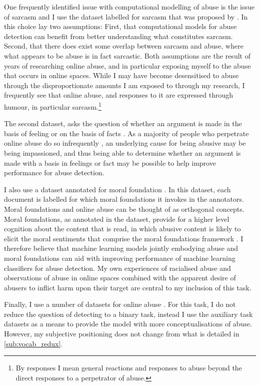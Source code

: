 {One frequently identified issue with computational modelling of abuse is the issue of sarcasm \citep{Rottger:2021} and I use the dataset labelled for sarcasm that was proposed by \citet{Oraby_sarcasm:2016}.
In this choice lay two assumptions: First, that computational models for abuse detection can benefit from better understanding what constitutes sarcasm.
Second, that there does exist some overlap between sarcasm and abuse, where what appears to be abuse is in fact sarcastic.
Both assumptions are the result of years of researching online abuse, and in particular exposing myself to the abuse that occurs in online spaces.
While I may have become desensitised to abuse through the disproportionate amounts I am exposed to through my research, I frequently see that online abuse, and responses to it are expressed through humour, in particular sarcasm.\footnote{By responses I mean general reactions and responses to abuse beyond the direct responses to a perpetrator of abuse.}

The second dataset, asks the question of whether an argument is made in the basis of feeling or on the basis of facts \citep{Oraby_factfeel:2015}.
As a majority of people who perpetrate online abuse do so infrequently \citep{Waseem-Hovy:2016}, an underlying cause for being abusive may be being impassioned, and thus being able to determine whether an argument is made with a basis in feelings or fact may be possible to help improve performance for abuse detection.

I also use a dataset annotated for moral foundation \citep{Hoover:2019}.
In this dataset, each document is labelled for which moral foundations it invokes in the annotators.
Moral foundations and online abuse can be thought of as orthogonal concepts.
Moral foundations, as annotated in the dataset, provide for a higher level cognition about the content that is read, in which abusive content is likely to elicit the moral sentiments that comprise the moral foundations framework \citep{Hoover:2019}.
I therefore believe that machine learning models jointly embodying abuse and moral foundations can aid with improving performance of machine learning classifiers for abuse detection.
My own experiences of racialised abuse and observations of abuse in online spaces combined with the apparent desire of abusers to inflict harm upon their target are central to my inclusion of this task.

Finally, I use a number of datasets for online abuse \citep{Garcia:2018,Waseem:2016,Waseem-Hovy:2016,Davidson:2017,Wulczyn:2016}.
For this task, I do not reduce the question of detecting to a binary task, instead I use the auxiliary task datasets as a means to provide the model with more conceptualisations of abuse.
However, my subjective positioning does not change from what is detailed in \autoref{sub:vocab_redux}.

}
